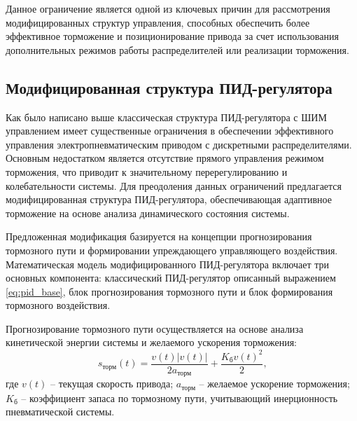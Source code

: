 Данное ограничение является одной из ключевых причин для рассмотрения модифицированных
структур управления, способных обеспечить более эффективное торможение и позиционирование
привода за счет использования дополнительных режимов работы распределителей или реализации
торможения.

\subsection{Модифицированная структура ПИД-регулятора}\label{subsec:ch3/sec2/sub3}

Как было написано выше классическая структура ПИД-регулятора с ШИМ управлением имеет существенные ограничения
в обеспечении эффективного управления электропневматическим приводом с дискретными распределителями.
Основным недостатком является отсутствие прямого управления режимом торможения, что приводит к значительному
перерегулированию и колебательности системы. Для преодоления данных ограничений предлагается модифицированная
структура ПИД-регулятора, обеспечивающая адаптивное торможение на основе анализа динамического состояния системы.

Предложенная модификация базируется на концепции прогнозирования тормозного пути и формировании упреждающего
управляющего воздействия. Математическая модель модифицированного ПИД-регулятора включает три основных
компонента: классический ПИД-регулятор описанный выражением \ref{eq:pid_base}, блок прогнозирования тормозного пути
и блок формирования тормозного воздействия.

Прогнозирование тормозного пути осуществляется на основе анализа
кинетической энергии системы и желаемого ускорения торможения:
\begin{equation*}\label{eq:braking_prediction}
	s_{\text{торм}}(t) = \frac{v(t)|v(t)|}{2a_{\text{торм}}} + \frac{K_{\text{б}}v(t)^2}{2}\text{,}
\end{equation*}
где $v(t)$ -- текущая скорость привода;
$a_{\text{торм}}$ -- желаемое ускорение торможения;
$K_{\text{б}}$ -- коэффициент запаса по тормозному пути, учитывающий инерционность пневматической системы.

